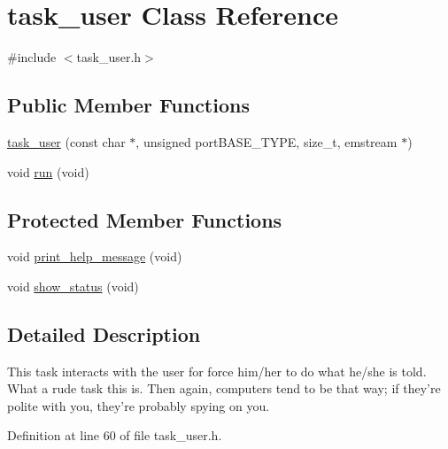 \hypertarget{classtask__user}{
\section{task\_\-user Class Reference}
\label{classtask__user}
}


{\ttfamily \#include $<$task\_\-user.h$>$}\subsection*{Public Member Functions}
\begin{DoxyCompactItemize}
\item 
\hyperlink{classtask__user_a3aba77563b375bb14838800608da48bc}{task\_\-user} (const char $\ast$, unsigned portBASE\_\-TYPE, size\_\-t, emstream $\ast$)
\item 
void \hyperlink{classtask__user_adca6429d57be25e8d411414fc8ad75af}{run} (void)
\end{DoxyCompactItemize}
\subsection*{Protected Member Functions}
\begin{DoxyCompactItemize}
\item 
void \hyperlink{classtask__user_a75475060f83bae1e44bcc8a5c34015c7}{print\_\-help\_\-message} (void)
\item 
void \hyperlink{classtask__user_a105bebbd9cb1031154c3dfc3662db4a0}{show\_\-status} (void)
\end{DoxyCompactItemize}


\subsection{Detailed Description}
This task interacts with the user for force him/her to do what he/she is told. What a rude task this is. Then again, computers tend to be that way; if they're polite with you, they're probably spying on you. 

Definition at line 60 of file task\_\-user.h.

